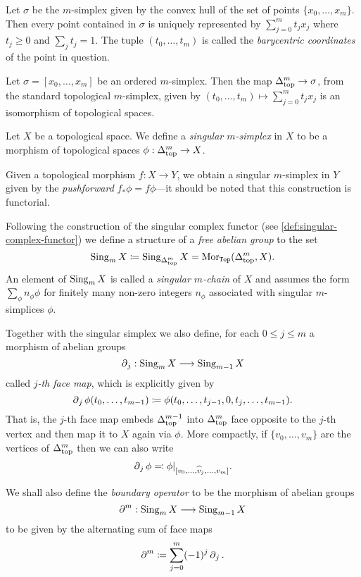 \begin{corollary}
\label{cor:barycentric-coordinates-simplex}
Let \(\sigma\) be the \(m\)-simplex given by the convex hull of the set of
points \(\{x_0, \dots, x_m\}\). Then every point contained in \(\sigma\) is
uniquely represented by \(\sum_{j=0}^m t_j x_j\) where \(t_j \geq 0\) and
\(\sum_j t_j = 1\). The tuple \((t_0, \dots, t_m)\) is called the
\emph{barycentric coordinates} of the point in question.
\end{corollary}

\begin{corollary}
\label{cor:ordered-simplex-iso-standard-simplex}
Let \(\sigma = [x_0, \dots, x_m]\) be an ordered \(m\)-simplex. Then the  map
\(\Delta_{\text{top}}^m \to \sigma\), from the standard topological \(m\)-simplex, given by
\((t_0, \dots, t_m) \mapsto \sum_{j=0}^m t_j x_j\) is an isomorphism of
topological spaces.
\end{corollary}

\begin{definition}
\label{def:singular-simplex}
Let \(X\) be a topological space. We define a \emph{singular \(m\)-simplex} in
\(X\) to be a morphism of topological spaces \(\phi: \Delta_{\text{top}}^m \to X\).

Given a topological morphism \(f: X \to Y\), we obtain a singular \(m\)-simplex
in \(Y\) given by the \emph{pushforward} \(f_{*}\phi = f \phi\)---it should be
noted that this construction is functorial.

Following the construction of the singular complex functor (see
\cref{def:singular-complex-functor}) we define a structure of a \emph{free
  abelian group} to the set
\[
\operatorname{Sing}_m X \coloneq \operatorname{Sing}_{\Delta_{\text{top}}^m} X = \operatorname{Mor}_{{\texttt{Top}}}(\Delta_{\text{top}}^m, X).
\]
An element of \(\operatorname{Sing}_m X\) is called a \emph{singular \(m\)-chain} of \(X\) and
assumes the form \(\sum_{\phi} n_{\phi} \phi\) for finitely many non-zero
integers \(n_{\phi}\) associated with singular \(m\)-simplices \(\phi\).

Together with the singular simplex we also define, for each \(0 \leq j \leq m\)
a morphism of abelian groups
\[
\operatorname{\partial}_j: \operatorname{Sing}_m X \longrightarrow \operatorname{Sing}_{m-1} X
\]
called \emph{\(j\)-th face map}, which is explicitly given by
\[
\operatorname{\partial}_j \phi(t_0, \dots, t_{m-1})
\coloneq \phi(t_0, \dots, t_{j-1}, 0, t_j, \dots, t_{m-1}).
\]
That is, the \(j\)-th face map embeds \(\Delta_{\text{top}}^{m-1}\) into \(\Delta_{\text{top}}^m\)
face opposite to the \(j\)-th vertex and then map it to \(X\) again via
\(\phi\). More compactly, if \(\{v_0, \dots, v_m\}\) are the vertices of
\(\Delta_{\text{top}}^m\) then we can also write
\[
\operatorname{\partial}_j \phi \eqqcolon \phi|_{[v_0, \dots, \widehat v_j, \dots, v_m]}.
\]

We shall also define the \emph{boundary operator} to be the morphism
of abelian groups
\[
\operatorname{\partial}^m: \operatorname{Sing}_m X \longrightarrow \operatorname{Sing}_{m-1} X
\]
to be given by the alternating sum of face maps
\[
\operatorname{\partial}^m \coloneq \sum_{j=0}^m (-1)^j \operatorname{\partial}_j.
\]
\end{definition}

